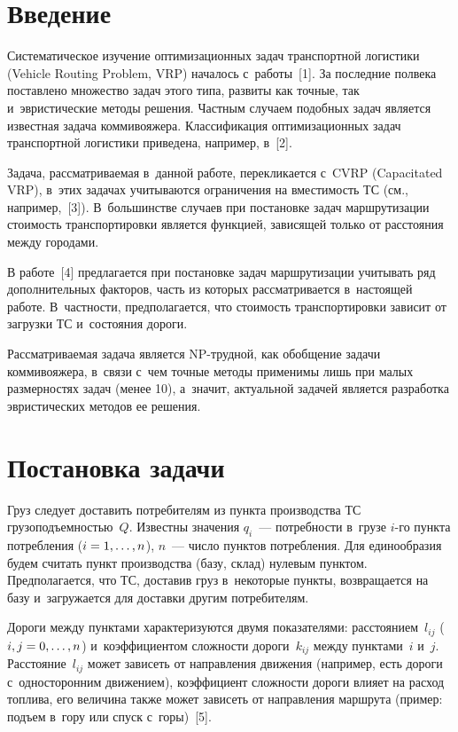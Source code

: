 \begin{multicols}{2}

\label{st\stat}

\section{Введение}

  Систематическое изучение оптимизационных задач транспортной логистики
(Vehicle Routing Problem, VRP) началось с~работы~[1]. За последние полвека
поставлено множество задач этого типа, развиты как точные, так
и~эвристические методы решения. Частным случаем подобных задач является
известная задача коммивояжера.
  Классификация оптимизационных задач транспортной логистики приведена,
например, в~[2].

  Задача, рассматриваемая в~данной работе, перекликается с~CVRP
(Capacitated VRP), в~этих задачах учитываются ограничения на вместимость
ТС (см., например,~[3]). В~большинстве случаев при постановке задач
маршрутизации стоимость транспортировки является функцией, зависящей
только от расстояния между городами.

  В работе~[4] предлагается при постановке задач маршрутизации учитывать
ряд дополнительных факторов, часть из которых рассматривается в~настоящей
работе. В~частности, предполагается, что стоимость транспортировки зависит
от загрузки ТС и~состояния дороги.

  Рассматриваемая задача является NP-труд\-ной, как обобщение задачи
коммивояжера, в~связи с~чем точные методы применимы лишь при малых
размерностях задач (менее 10), а~значит, актуальной задачей является
разработка эвристических методов ее решения.

\section{Постановка задачи}

  Груз следует доставить потребителям из пункта производства
ТС грузоподъемностью~$Q$. Известны значения $q_i$~--- потребности
в~грузе $i$-го пункта потребления ($i\hm=1, \ldots, n$), $n$~--- число пунктов
потребления. Для единообразия будем считать пункт производства (базу, склад)
нулевым пунктом. Предполагается, что ТС, доставив груз в~некоторые пункты,
возвращается на базу и~загружается для доставки другим потребителям.

  Дороги между пунктами характеризуются двумя показателями:
расстоянием~$l_{ij}$ ($i, j\hm=0, \ldots , n$) и~коэффициен\-том слож\-ности
дороги~$k_{ij}$ между пунктами~$i$ и~$j$. Расстояние~$l_{ij}$ может зависеть от
направления движения (например, есть дороги с~односторонним движением),
коэффициент слож\-ности дороги влияет на расход топлива, его величина также
может зависеть от направления маршрута (пример: подъем в~гору или спуск
с~горы)~[5].


\end{multicols}

